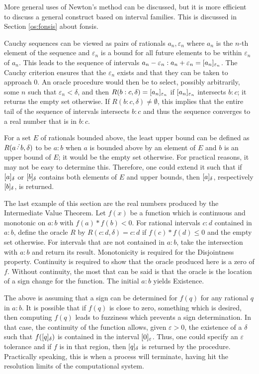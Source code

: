 \documentclass[12pt]{article}
\begin{document}
More general uses of Newton's method can be discussed, but it is more efficient to discuss a general construct based on interval families. This is discussed in Section \ref{os:fonsis} about fonsis. 

Cauchy sequences can be viewed as pairs of rationals $a_n, \varepsilon_n$ where $a_n$ is the $n$-th element of the sequence and $\varepsilon_n$ is a bound for all future elements to be within $\varepsilon_n$ of $a_n$. This leads to the sequence of intervals $a_n-\varepsilon_n:a_n+\varepsilon_n = \halo[ \varepsilon_n]{a_n}$. The Cauchy criterion ensures that the $\varepsilon_n$ exists and that they can be taken to approach 0. An oracle procedure would then be to select, possibly arbitrarily, some $n$ such that $\varepsilon_n < \delta$, and then  $R(b:c, \delta) = \halo[ \varepsilon_n]{a_n}$ if $\halo[\varepsilon_n]{a_n}$ intersects $b:c$; it returns the empty set otherwise. If $R(b:c, \delta) \neq \emptyset$, this implies that the entire tail of the sequence of intervals intersects $b:c$ and thus the sequence converges to a real number that is in $b:c$.  

For a set $E$ of rationals bounded above, the least upper bound can be defined as $R(a \lte b, \delta)$ to be $a:b$ when $a$ is bounded above by an element of $E$ and $b$ is an upper bound of $E$; it would be the empty set otherwise. For practical reasons, it may not be easy to determine this. Therefore, one could extend it such that if $\halo{a}$ or $\halo{b}$ contains both elements of $E$ and upper bounds, then $\halo{a}$, respectively $\halo{b}$, is returned. 

The last example of this section are the real numbers produced by the Intermediate Value Theorem. Let $f(x)$ be a function which is continuous and monotonic on $a:b$ with $f(a)*f(b) < 0$. For rational intervals $c:d$ contained in $a:b$, define the oracle $R$ by $R(c:d, \delta) = c:d$ if $f(c)*f(d) \leq 0$ and the empty set otherwise. For intervals that are not contained in $a:b$, take the intersection with $a:b$ and return its result. Monotonicity is required for the Disjointness property. Continuity is required to show that the oracle produced here is a zero of $f$. Without continuity, the most that can be said is that the oracle is the location of a sign change for the function. The initial $a:b$ yields Existence.

The above is assuming that a sign can be determined for $f(q)$ for any rational $q$ in $a:b$. It is possible that if $f(q)$ is close to zero, something which is desired, then computing $f(q)$ leads to fuzziness which prevents a sign determination. In that case, the continuity of the function allows, given $\varepsilon > 0$, the existence of a $\delta$ such that $f(\halo{q})$ is contained in the interval $\halo[\varepsilon]{0}$. Thus, one could specify an $\varepsilon$ tolerance and if $f$ is in that region, then $\halo{q}$ is returned by the procedure. Practically speaking, this is when a process will terminate, having hit the resolution limits of the computational system. 
\end{document}
